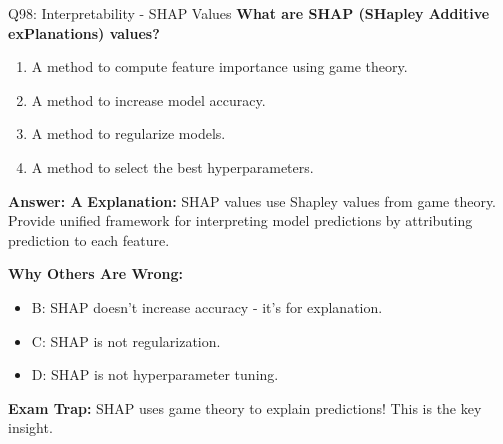 \documentclass[8pt]{beamer}
\begin{document}
	\begin{frame}{Q98: Interpretability - SHAP Values}
		\fontsize{6.5}{7.5}\selectfont
		\textbf{What are SHAP (SHapley Additive exPlanations) values?}
		
		\begin{enumerate}
			\item A method to compute feature importance using game theory.
			\item A method to increase model accuracy.
			\item A method to regularize models.
			\item A method to select the best hyperparameters.
		\end{enumerate}
		
		\vspace{0.05cm}
		\textcolor{myblue}{\textbf{Answer: A}}
		\vspace{0.05cm}
		\textcolor{myblue}{\textbf{Explanation:}} SHAP values use Shapley values from game theory. Provide unified framework for interpreting model predictions by attributing prediction to each feature.
		
		\vspace{0.05cm}
		\textcolor{myred}{\textbf{Why Others Are Wrong:}}
		\begin{itemize}
			\item \textcolor{myred}{B:} SHAP doesn't increase accuracy - it's for explanation.
			\item \textcolor{myred}{C:} SHAP is not regularization.
			\item \textcolor{myred}{D:} SHAP is not hyperparameter tuning.
		\end{itemize}
		
		\textcolor{myred}{\textbf{Exam Trap:}} SHAP uses \textcolor{myblue}{game theory} to explain predictions! This is the key insight.
	\end{frame}
	
\end{document}
